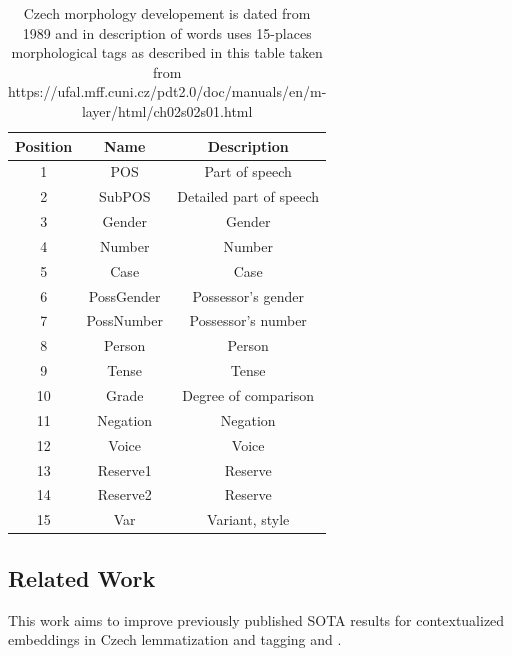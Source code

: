 \begin{table}
\centering
\label{Tab:tagset}
\begin{tabular}{ |c|c|c| } 

 \hline
 Position & Name & Description \\ 
 \hline \hline
 1 & POS & Part of speech \\ \hline
 2 & SubPOS & Detailed part of speech \\ \hline
  3 & Gender & Gender \\ \hline
4 & Number & Number \\\hline
  5 & Case & Case \\ \hline
 6 & PossGender & Possessor's gender \\\hline
  7 & PossNumber & Possessor's number \\ \hline
8 & Person & Person \\\hline
  9 & Tense & Tense \\ \hline
 10 & Grade & Degree of comparison\\\hline
  11 & Negation & Negation \\ \hline
 12 & Voice & Voice \\\hline
 13 & Reserve1 & Reserve \\ \hline
14 & Reserve2 & Reserve \\\hline
  15 & Var & Variant, style \\ 
 \hline

\end{tabular}
\caption{Czech morphology developement is dated from 1989 \citep{Hajic2004} %
and in description of words uses 15-places morphological tags as described in this table taken from https://ufal.mff.cuni.cz/pdt2.0/doc/manuals/en/m-layer/html/ch02s02s01.html}
\end{table}

\subsection{Related Work}
This work aims to improve previously published SOTA results for contextualized embeddings in Czech lemmatization and tagging \citep{straka2019czech} and \citep{Straka2021}.

